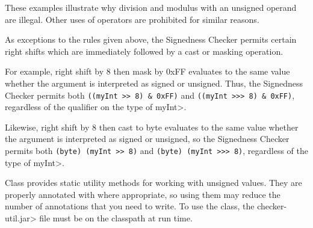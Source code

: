 These examples illustrate why division and modulus with an unsigned operand
are illegal.  Other uses of operators are prohibited for similar reasons.



As exceptions to the rules given above, the Signedness Checker permits
certain right shifts which are immediately followed by a cast or
masking operation.

For example, right shift by 8 then mask by 0xFF evaluates to the same value
whether the argument is interpreted as signed or unsigned.  Thus, the
Signedness Checker permits both \verb|((myInt >> 8) & 0xFF)| and
\verb|((myInt >>> 8) & 0xFF)|, regardless of the qualifier on the type of
\<myInt>.

Likewise, right shift by 8 then cast to byte evaluates to the
same value whether the argument is interpreted as signed or unsigned, so
the Signedness Checker permits both \verb|(byte) (myInt >> 8)| and
\verb|(byte) (myInt >>> 8)|, regardless of the type of \<myInt>.






Class  provides static
utility methods for working with unsigned values.  They are
properly annotated with 
where appropriate, so using them may reduce the number of annotations that
you need to write.
To use the  class, the
\<checker-util.jar> file must be on the classpath at run time.

